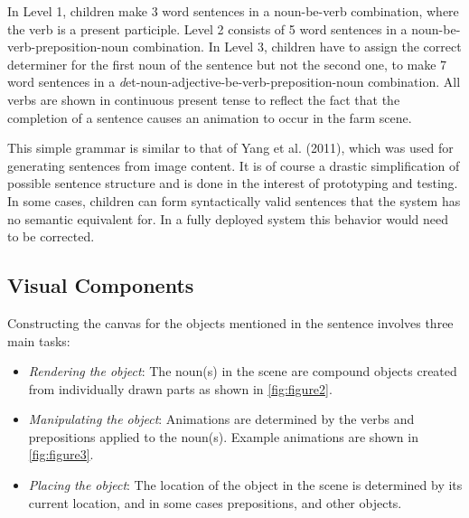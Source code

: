 \documentclass{sigchi-ext}
\begin{document}
In Level 1, children make 3 word sentences in a noun-be-verb combination, where the verb is a present participle. Level 2 consists of 5 word sentences in a noun-be-verb-preposition-noun combination. In Level 3, children have to assign the correct determiner for the first noun of the sentence but not the second one, to make 7 word sentences in a \emph det-noun-adjective-be-verb-preposition-noun combination.  All verbs are shown in continuous present tense to reflect the fact that the completion of a sentence causes an animation to occur in the farm scene.

This simple grammar is similar to that of Yang et al. (2011), which was used for generating sentences from image content.  It is of course a drastic simplification of possible sentence structure and is done in the interest of prototyping and testing.  In some cases, children can form syntactically valid sentences that the system has no semantic equivalent for.  In a fully deployed system this behavior would need to be corrected.

\subsection{Visual Components}
Constructing the canvas for the objects mentioned in the sentence involves three main tasks:

\begin{itemize}\compresslist
\item 	
\emph {Rendering the object}: The noun(s) in the scene are compound objects created from individually drawn parts as shown in \autoref {fig:figure2}.
\item 	
\emph {Manipulating the object}:  Animations are determined by the verbs and prepositions applied to the noun(s).  Example animations are shown in \autoref {fig:figure3}.
\item 	
\emph {Placing the object}:  The location of the object in the scene is determined by its current location, and in some cases prepositions, and other objects.
\end{itemize}
\end{document}
